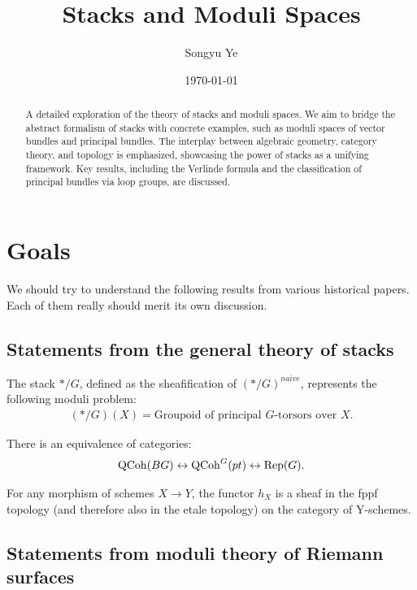 \documentclass[12pt]{article}
\title{Stacks and Moduli Spaces}
\author{Songyu Ye}
\date{\today}
\begin{document}
\notestitle

\begin{abstract}
    A detailed exploration of the theory of stacks and moduli spaces. We aim to bridge the abstract formalism of stacks with concrete examples, such as moduli spaces of vector bundles and principal bundles. The interplay between algebraic geometry, category theory, and topology is emphasized, showcasing the power of stacks as a unifying framework. Key results, including the Verlinde formula and the classification of principal bundles via loop groups, are discussed.
\end{abstract}

\tableofcontents
\section{Goals}
We should try to understand the following results from various historical papers. Each of them really should merit its own discussion.
\subsection{Statements from the general theory of stacks}

\begin{proposition}
    The stack $*/G$, defined as the sheafification of $(*/G)^{naive}$, represents the following moduli problem:
    \begin{align*}
        (*/G)(X) = \text{Groupoid of principal $G$-torsors over $X$}.
    \end{align*}
\end{proposition}

\begin{proposition}
    There is an equivalence of categories:
    \begin{align*}
        \operatorname{QCoh}(BG) \leftrightarrow \operatorname{QCoh}^G(pt) \leftrightarrow \operatorname{Rep}(G).
    \end{align*}
\end{proposition}
\begin{theorem}
    For any morphism of schemes $X\to Y$, the functor $h_X$ is a sheaf in the fppf topology (and therefore also in the etale topology) on the category of Y-schemes.
\end{theorem}

\subsection{Statements from moduli theory of Riemann surfaces}
\end{document}
